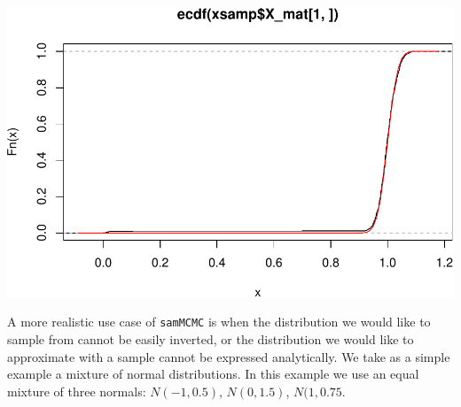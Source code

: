 \documentclass[]{article}
\newenvironment{Shaded}{\begin{snugshade}}{\end{snugshade}}
\newcommand{\ControlFlowTok}[1]{\textcolor[rgb]{0.13,0.29,0.53}{\textbf{#1}}}
\newcommand{\DataTypeTok}[1]{\textcolor[rgb]{0.13,0.29,0.53}{#1}}
\newcommand{\DecValTok}[1]{\textcolor[rgb]{0.00,0.00,0.81}{#1}}
\newcommand{\FloatTok}[1]{\textcolor[rgb]{0.00,0.00,0.81}{#1}}
\newcommand{\KeywordTok}[1]{\textcolor[rgb]{0.13,0.29,0.53}{\textbf{#1}}}
\newcommand{\NormalTok}[1]{#1}
\newcommand{\OperatorTok}[1]{\textcolor[rgb]{0.81,0.36,0.00}{\textbf{#1}}}
\newcommand{\OtherTok}[1]{\textcolor[rgb]{0.56,0.35,0.01}{#1}}
\newcommand{\StringTok}[1]{\textcolor[rgb]{0.31,0.60,0.02}{#1}}
\begin{document}
\includegraphics{replication_code_files/figure-latex/unnamed-chunk-5-1.pdf}

A more realistic use case of \texttt{samMCMC} is when the distribution
we would like to sample from cannot be easily inverted, or the
distribution we would like to approximate with a sample cannot be
expressed analytically. We take as a simple example a mixture of normal
distributions. In this example we use an equal mixture of three normals:
\(N(-1, 0.5)\), \(N(0, 1.5)\), \(N(1, 0.75\).

\begin{Shaded}
\end{Shaded}
\end{document}
